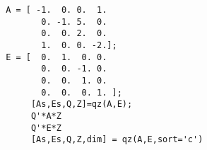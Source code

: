 \begin{examples}
  \begin{Verbatim}
 A = [ -1.  0. 0.  1. 
        0. -1. 5.  0. 
        0.  0. 2.  0. 
        1.  0. 0. -2.];
 E = [  0.  1.  0. 0. 
        0.  0. -1. 0. 
        0.  0.  1. 0. 
        0.  0.  0. 1. ];
      [As,Es,Q,Z]=qz(A,E);
      Q'*A*Z 
      Q'*E*Z 
      [As,Es,Q,Z,dim] = qz(A,E,sort='c')
  \end{Verbatim}
\end{examples}
\begin{manseealso}
    
\end{manseealso}
